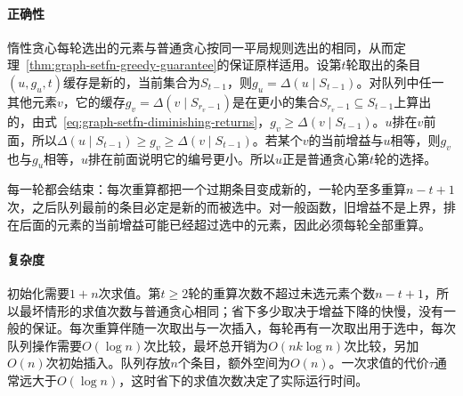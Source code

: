 \paragraph{正确性}
惰性贪心每轮选出的元素与普通贪心按同一平局规则选出的相同，从而定理~\ref{thm:graph-setfn-greedy-guarantee}的保证原样适用。设第$t$轮取出的条目$(u,g_u,t)$缓存是新的，当前集合为$S_{t-1}$，则$g_u=\Delta(u\mid S_{t-1})$。对队列中任一其他元素$v$，它的缓存$g_v=\Delta(v\mid S_{r_v-1})$是在更小的集合$S_{r_v-1}\subseteq S_{t-1}$上算出的，由式~\eqref{eq:graph-setfn-diminishing-returns}，$g_v\geq\Delta(v\mid S_{t-1})$。$u$排在$v$前面，所以$\Delta(u\mid S_{t-1})\geq g_v\geq\Delta(v\mid S_{t-1})$。若某个$v$的当前增益与$u$相等，则$g_v$也与$g_u$相等，$u$排在前面说明它的编号更小。所以$u$正是普通贪心第$t$轮的选择。

每一轮都会结束：每次重算都把一个过期条目变成新的，一轮内至多重算$n-t+1$次，之后队列最前的条目必定是新的而被选中。对一般函数，旧增益不是上界，排在后面的元素的当前增益可能已经超过选中的元素，因此必须每轮全部重算。

\paragraph{复杂度}
初始化需要$1+n$次求值。第$t\geq2$轮的重算次数不超过未选元素个数$n-t+1$，所以最坏情形的求值次数与普通贪心相同；省下多少取决于增益下降的快慢，没有一般的保证。每次重算伴随一次取出与一次插入，每轮再有一次取出用于选中，每次队列操作需要$O(\log n)$次比较，最坏总开销为$O(nk\log n)$次比较，另加$O(n)$次初始插入。队列存放$n$个条目，额外空间为$O(n)$。一次求值的代价$\tau$通常远大于$O(\log n)$，这时省下的求值次数决定了实际运行时间。
